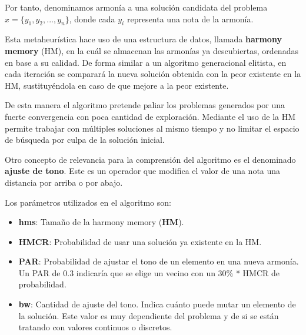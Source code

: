 \vspace{\baselineskip}

Por tanto, denominamos armonía a una solución candidata del problema \\
$x = \{y_1, y_2, ..., y_n\}$, donde cada $y_i$ representa una nota de la armonía.

\vspace{\baselineskip}

Esta metaheurística hace uso de una estructura de datos, llamada \textbf{harmony memory} (HM), en la cuál se almacenan las armonías ya descubiertas, ordenadas en base a su calidad. De forma similar a un algoritmo generacional elitista, en cada iteración se comparará la nueva solución obtenida con la peor existente en la HM, sustituyéndola en caso de que mejore a la peor existente.

De esta manera el algoritmo pretende paliar los problemas generados por una fuerte convergencia con poca cantidad de exploración. Mediante el uso de la HM permite trabajar con múltiples soluciones al mismo tiempo y no limitar el espacio de búsqueda por culpa de la solución inicial.

\vspace{\baselineskip}

Otro concepto de relevancia para la comprensión del algoritmo es el denominado \textbf{ajuste de tono}. Este es un operador que modifica el valor de una nota una distancia por arriba o por abajo.

\vspace{\baselineskip}

Los parámetros utilizados en el algoritmo son:
\begin{itemize}
    \item \textbf{hms}: Tamaño de la harmony memory (\textbf{HM}).
    \item \textbf{HMCR}: Probabilidad de usar una solución ya existente en la HM.
    \item \textbf{PAR}: Probabilidad de ajustar el tono de un elemento en una nueva armonía. Un PAR de 0.3 indicaría que se elige un vecino con un 30\% * HMCR de probabilidad.
    \item \textbf{bw}: Cantidad de ajuste del tono. Indica cuánto puede mutar un elemento de la solución. Este valor es muy dependiente del problema y de si se están tratando con valores continuos o discretos.
\end{itemize}

\vspace{\baselineskip}

